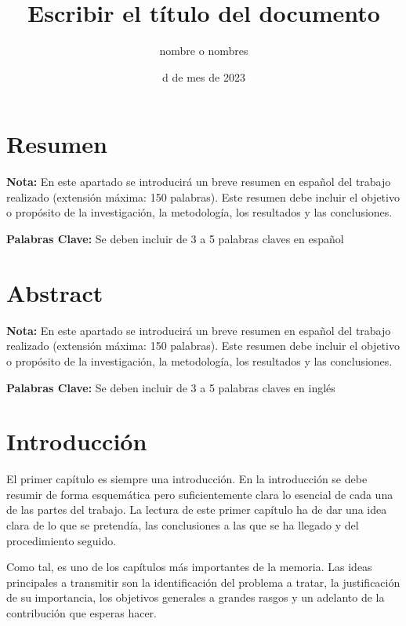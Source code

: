\documentclass[11pt,a4paper,spanish]{book}
\title{Escribir el título del documento}
\author{nombre o nombres}
\date{d de mes de 2023}
\numberwithin{equation}{chapter}
\numberwithin{figure}{chapter}
\begin{document}
\renewcommand{\listfigurename}{Índice de Ilustraciones}
\renewcommand{\listtablename}{Índice de Tablas}
\renewcommand{\contentsname}{Índice de Contenidos}
\renewcommand{\figurename}{Figura}
\renewcommand{\tablename}{Tabla} 

\maketitle

\frontmatter
\tableofcontents
\listoffigures
\listoftables

\chapter{Resumen}
{\bf Nota:} En este apartado se introducirá un breve resumen en español del trabajo realizado (extensión máxima: 150 palabras). Este resumen debe incluir el objetivo o propósito de la investigación, la metodología, los resultados y las conclusiones.


{\bf Palabras Clave:} Se deben incluir de 3 a 5 palabras claves en español

\chapter{Abstract}
{\bf Nota:} En este apartado se introducirá un breve resumen en español del trabajo realizado (extensión máxima: 150 palabras). Este resumen debe incluir el objetivo o propósito de la investigación, la metodología, los resultados y las conclusiones.


{\bf Palabras Clave:} Se deben incluir de 3 a 5 palabras claves en inglés




\mainmatter
\chapter{Introducción}

El primer capítulo es siempre una introducción. En la introducción se debe resumir de forma esquemática pero suficientemente clara lo esencial de cada una de las partes del trabajo. La lectura de este primer capítulo ha de dar una idea clara de lo que se pretendía, las conclusiones a las que se ha llegado y del procedimiento seguido.

Como tal, es uno de los capítulos más importantes de la memoria. Las ideas principales a transmitir son la identificación del problema a tratar, la justificación de su importancia, los objetivos generales a grandes rasgos y un adelanto de la contribución que esperas hacer.
\end{document}
